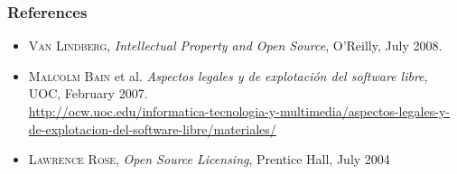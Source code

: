 
\begin{frame}
\frametitle{References}

\begin{itemize}
\item \textsc{Van Lindberg}, \textit{Intellectual Property and Open Source}, O'Reilly, July 2008.
\item \textsc{Malcolm Bain} et al. \textit{Aspectos legales y de explotación del software libre}, UOC, February 2007. \\
\url{http://ocw.uoc.edu/informatica-tecnologia-y-multimedia/aspectos-legales-y-de-explotacion-del-software-libre/materiales/}
\item \textsc{Lawrence Rose}, \textit{Open Source Licensing}, Prentice Hall, July 2004 
\end{itemize}

\end{frame}






